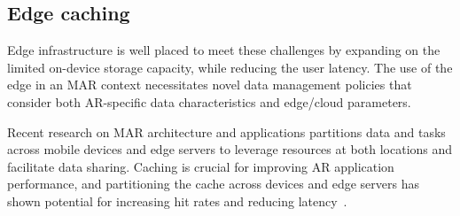
    

\subsection{Edge caching}
    Edge infrastructure is well placed to meet these challenges by expanding on the limited on-device storage capacity, while reducing the user latency. The use of the edge in an MAR context necessitates novel data management policies that consider both AR-specific data characteristics and edge/cloud parameters. 
    
    Recent research on MAR architecture and applications \cite{bib:edgearch, bib:carsar, bib:sear,bib:localcache,bib:slamshare} partitions data and tasks across mobile devices and edge servers to leverage resources at both locations and facilitate data sharing. Caching is crucial for improving AR application performance, and partitioning the cache across devices and edge servers has shown potential for increasing hit rates and reducing latency~\cite{bib:carsar, bib:sear}. 
    
